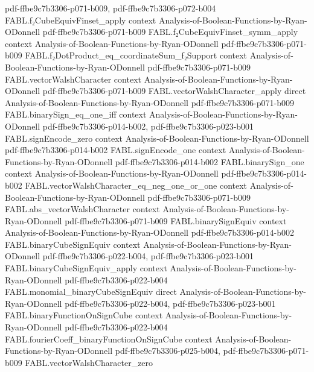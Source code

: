 \begin{theorem}
  {pdf-ffbe9c7b3306-p071-b009,
    pdf-ffbe9c7b3306-p072-b004}
\proofstep
  {FABL.f₂CubeEquivFinset_apply}
  {context}
  {Analysis-of-Boolean-Functions-by-Ryan-ODonnell}
  {pdf-ffbe9c7b3306-p071-b009}
\proofstep
  {FABL.f₂CubeEquivFinset_symm_apply}
  {context}
  {Analysis-of-Boolean-Functions-by-Ryan-ODonnell}
  {pdf-ffbe9c7b3306-p071-b009}
\proofstep
  {FABL.f₂DotProduct_eq_coordinateSum_f₂Support}
  {context}
  {Analysis-of-Boolean-Functions-by-Ryan-ODonnell}
  {pdf-ffbe9c7b3306-p071-b009}
\proofstep
  {FABL.vectorWalshCharacter}
  {context}
  {Analysis-of-Boolean-Functions-by-Ryan-ODonnell}
  {pdf-ffbe9c7b3306-p071-b009}
\proofstep
  {FABL.vectorWalshCharacter_apply}
  {direct}
  {Analysis-of-Boolean-Functions-by-Ryan-ODonnell}
  {pdf-ffbe9c7b3306-p071-b009}
\proofstep
  {FABL.binarySign_eq_one_iff}
  {context}
  {Analysis-of-Boolean-Functions-by-Ryan-ODonnell}
  {pdf-ffbe9c7b3306-p014-b002,
    pdf-ffbe9c7b3306-p023-b001}
\proofstep
  {FABL.signEncode_zero}
  {context}
  {Analysis-of-Boolean-Functions-by-Ryan-ODonnell}
  {pdf-ffbe9c7b3306-p014-b002}
\proofstep
  {FABL.signEncode_one}
  {context}
  {Analysis-of-Boolean-Functions-by-Ryan-ODonnell}
  {pdf-ffbe9c7b3306-p014-b002}
\proofstep
  {FABL.binarySign_one}
  {context}
  {Analysis-of-Boolean-Functions-by-Ryan-ODonnell}
  {pdf-ffbe9c7b3306-p014-b002}
\proofstep
  {FABL.vectorWalshCharacter_eq_neg_one_or_one}
  {context}
  {Analysis-of-Boolean-Functions-by-Ryan-ODonnell}
  {pdf-ffbe9c7b3306-p071-b009}
\proofstep
  {FABL.abs_vectorWalshCharacter}
  {context}
  {Analysis-of-Boolean-Functions-by-Ryan-ODonnell}
  {pdf-ffbe9c7b3306-p071-b009}
\proofstep
  {FABL.binarySignEquiv}
  {context}
  {Analysis-of-Boolean-Functions-by-Ryan-ODonnell}
  {pdf-ffbe9c7b3306-p014-b002}
\proofstep
  {FABL.binaryCubeSignEquiv}
  {context}
  {Analysis-of-Boolean-Functions-by-Ryan-ODonnell}
  {pdf-ffbe9c7b3306-p022-b004,
    pdf-ffbe9c7b3306-p023-b001}
\proofstep
  {FABL.binaryCubeSignEquiv_apply}
  {context}
  {Analysis-of-Boolean-Functions-by-Ryan-ODonnell}
  {pdf-ffbe9c7b3306-p022-b004}
\proofstep
  {FABL.monomial_binaryCubeSignEquiv}
  {direct}
  {Analysis-of-Boolean-Functions-by-Ryan-ODonnell}
  {pdf-ffbe9c7b3306-p022-b004,
    pdf-ffbe9c7b3306-p023-b001}
\proofstep
  {FABL.binaryFunctionOnSignCube}
  {context}
  {Analysis-of-Boolean-Functions-by-Ryan-ODonnell}
  {pdf-ffbe9c7b3306-p022-b004}
\proofstep
  {FABL.fourierCoeff_binaryFunctionOnSignCube}
  {context}
  {Analysis-of-Boolean-Functions-by-Ryan-ODonnell}
  {pdf-ffbe9c7b3306-p025-b004,
    pdf-ffbe9c7b3306-p071-b009}
\proofstep
  {FABL.vectorWalshCharacter_zero}

\end{theorem}
